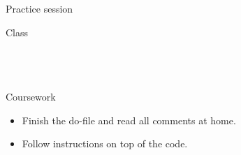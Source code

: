 \documentclass[t]{beamer}
\begin{document}
	\begin{frame}[t]{Practice session}

    \begin{block}{Class}
      \\
      \\
      
			\\
			\\    
    \end{block}

    \begin{alertblock}{Coursework}
      \begin{itemize}
	       \item Finish the do-file and read all comments at home.
	       \item Follow instructions on top of the code.
      \end{itemize}
    \end{alertblock}
    		
	\end{frame}
    
\end{document}

